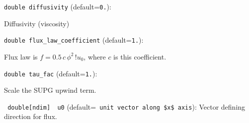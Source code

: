 \item\verb+double diffusivity+ {\rm(default=\verb|0.|)}:

Diffusivity (viscosity)
\item\verb+double flux_law_coefficient+ {\rm(default=\verb|1.|)}:

Flux law is $f= 0.5\,c\, \phi^2\,!u_0$, where $c$
is this coefficient. 
\item\verb+double tau_fac+ {\rm(default=\verb|1.|)}:

Scale the SUPG upwind term. 
\item\verb+ double[ndim]  u0+ {\rm(default=\verb| unit vector along $x$ axis|)}:
 Vector defining direction for flux. %
